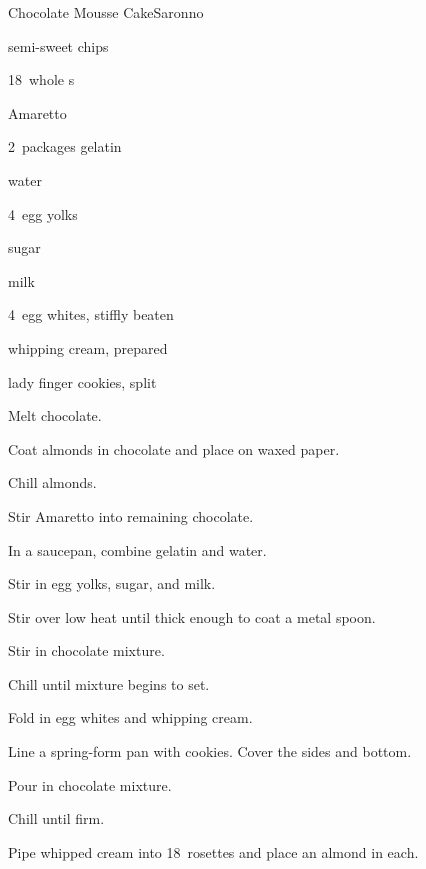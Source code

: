 \begin{recipe}{Chocolate Mousse Cake}{Saronno}{}

\begin{ingredients}
\item {} semi-sweet  chips
\item 18~whole s
\item \C{\half} Amaretto
\item 2~packages gelatin
\item \C{\quarter} water
\item 4~egg yolks
\item \C{\third} sugar
\item {} milk
\item 4~egg whites, stiffly beaten
\item {} whipping cream, prepared
\item {} lady finger cookies, split
\end{ingredients}

\begin{directions}
\item Melt chocolate.
\item Coat almonds in chocolate and place on waxed paper.
\item Chill almonds.
\item Stir Amaretto into remaining chocolate.
\item In a saucepan, combine gelatin and water.
\item Stir in egg yolks, sugar, and milk.
\item Stir over low heat until thick enough to coat a metal spoon.
\item Stir in chocolate mixture.
\item Chill until mixture begins to set.
\item Fold in egg whites and whipping cream.
\item Line a  spring-form pan with cookies. Cover the sides and bottom.
\item Pour in chocolate mixture.
\item Chill until firm.
\item Pipe whipped cream into 18~rosettes and place an almond in each.
\end{directions}

\end{recipe}
